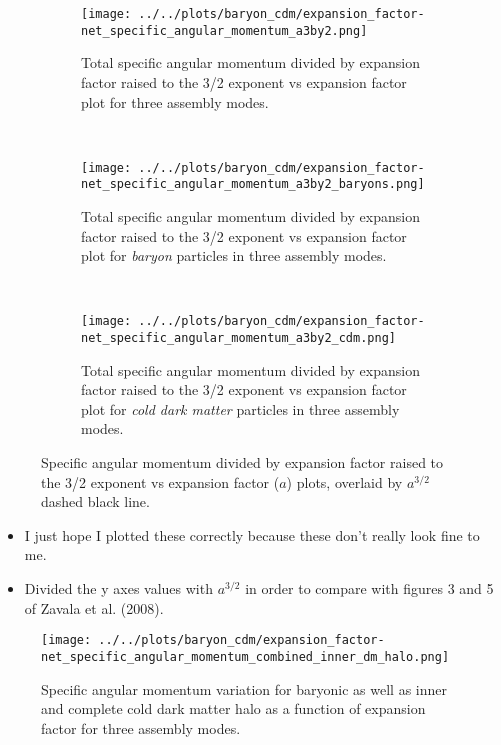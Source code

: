 \documentclass{article}
\begin{document}
	\begin{figure} [h!]
		\centering
		\begin{subfigure} {\columnwidth}
				\centering 
				\texttt{[image: ../../plots/baryon\_cdm/expansion\_factor-net\_specific\_angular\_momentum\_a3by2.png]}
				\caption{Total specific angular momentum divided by expansion factor raised to the 3/2 exponent vs expansion factor plot for three assembly modes.}
		\end{subfigure} \\
			\vspace{1cm}
		\begin{subfigure} {\columnwidth}
				\centering 
				\texttt{[image: ../../plots/baryon\_cdm/expansion\_factor-net\_specific\_angular\_momentum\_a3by2\_baryons.png]}
				\caption{Total specific angular momentum divided by expansion factor raised to the 3/2 exponent vs expansion factor plot for \emph{baryon} particles in three assembly modes.}
		\end{subfigure} \\
			\vspace{1cm}
		\begin{subfigure} {\columnwidth}
				\centering 
				\texttt{[image: ../../plots/baryon\_cdm/expansion\_factor-net\_specific\_angular\_momentum\_a3by2\_cdm.png]}
				\caption{Total specific angular momentum divided by expansion factor raised to the 3/2 exponent vs expansion factor plot for \emph{cold dark matter} particles in three assembly modes.}
		\end{subfigure}
		\caption{Specific angular momentum divided by expansion factor raised to the 3/2 exponent vs expansion factor (\(a\)) plots, overlaid by \(a^{3/2}\) dashed black line.}
	\end{figure}

	\begin{itemize}
		\item I just hope I plotted these correctly because these don't really look fine to me. 
		\item Divided the y axes values with \(a^{3/2}\) in order to compare with figures 3 and 5 of Zavala et al. (2008).
	\end{itemize}

	\clearpage 
	\begin{figure} 
		\centering 
		\texttt{[image: ../../plots/baryon\_cdm/expansion\_factor-net\_specific\_angular\_momentum\_combined\_inner\_dm\_halo.png]}
		\caption{Specific angular momentum variation for baryonic as well as inner and complete cold dark matter halo as a function of expansion factor for three assembly modes.}
	\end{figure}
\end{document}
